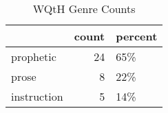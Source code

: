 \begin{table}[htbp!]
\centering
\caption{WQtH Genre Counts}
\label{table:WQtH_gen_ct}
\begin{tabular}{lrl}
\toprule
{} &  count & percent \\
\midrule
prophetic   &     24 &     65\% \\
prose       &      8 &     22\% \\
instruction &      5 &     14\% \\
\bottomrule
\end{tabular}
\end{table}
